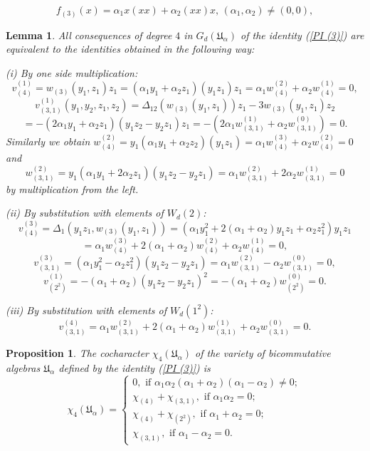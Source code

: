 \documentclass[10pt,a4paper]{amsart}
\newtheorem{lemma}{Lemma}
\newtheorem{proposition}{Proposition}
\begin{document}
\begin{equation}\label{PI (3)}
f_{(3)}(x)=\alpha_1 x(xx)+\alpha_2 (xx)x,\,(\alpha_1,\alpha_2)\not=(0,0),
\end{equation}

\begin{lemma}\label{consequences of M(3) in G}
All consequences of degree $4$ in $G_d({\mathfrak U}_{\alpha})$ of the identity {\rm (\ref{PI (3)})} are equivalent to the identities obtained in the following way:

{\rm (i)} By one side multiplication:
\[
v^{(1)}_{(4)}=w_{(3)}(y_1,z_1)z_1=(\alpha_1y_1+\alpha_2z_1)(y_1z_1)z_1=\alpha_1w_{(4)}^{(2)}+\alpha_2w_{(4)}^{(1)}=0,
\]
\[
v^{(1)}_{(3,1)}(y_1,y_2,z_1,z_2)=\Delta_{12}(w_{(3)}(y_1,z_1))z_1-3w_{(3)}(y_1,z_1)z_2
\]
\[
=-(2\alpha_1y_1+\alpha_2z_1)(y_1z_2-y_2z_1)z_1=-(2\alpha_1w_{(3,1)}^{(1)}+\alpha_2w_{(3,1)}^{(0)})=0.
\]
Similarly we obtain $w^{(2)}_{(4)}=y_1(\alpha_1y_1+\alpha_2z_2)(y_1z_1)=\alpha_1w_{(4)}^{(3)}+\alpha_2w_{(4)}^{(2)}=0$ and
\[
w^{(2)}_{(3,1)}=y_1(\alpha_1y_1+2\alpha_2z_1)(y_1z_2-y_2z_1)=\alpha_1w_{(3,1)}^{(2)}+2\alpha_2w_{(3,1)}^{(1)}=0
\]
by multiplication from the left.

{\rm (ii)} By substitution with elements of $W_d(2)$:
\[
v^{(3)}_{(4)}=\Delta_1(y_1z_1,w_{(3)}(y_1,z_1))=(\alpha_1y_1^2+2(\alpha_1+\alpha_2)y_1z_1+\alpha_2z_1^2)y_1z_1
\]
\[
=\alpha_1w_{(4)}^{(3)}+2(\alpha_1+\alpha_2)w_{(4)}^{(2)}+\alpha_2w_{(4)}^{(1)}=0,
\]
\[
v^{(3)}_{(3,1)}=(\alpha_1y_1^2-\alpha_2z_1^2)(y_1z_2-y_2z_1)=\alpha_1w_{(3,1)}^{(2)}-\alpha_2w_{(3,1)}^{(0)}=0,
\]
\[
v^{(1)}_{(2^2)}=-(\alpha_1+\alpha_2)(y_1z_2-y_2z_1)^2=-(\alpha_1+\alpha_2)w_{(2^2)}^{(0)}=0.
\]

{\rm (iii)} By substitution with elements of $W_d(1^2)$:
\[
v^{(4)}_{(3,1)}=\alpha_1w_{(3,1)}^{(2)}+2(\alpha_1+\alpha_2)w_{(3,1)}^{(1)}+\alpha_2w_{(3,1)}^{(0)}=0.
\]
\end{lemma}

\begin{proposition}\label{chi4 for (3)}
The cocharacter $\chi_4({\mathfrak U}_{\alpha})$ of the variety of bicommutative algebras ${\mathfrak U}_{\alpha}$ defined by the identity {\rm (\ref{PI (3)})} is
\[
\chi_4({\mathfrak U}_{\alpha})=\begin{cases}
0,\text{ if }\alpha_1\alpha_2(\alpha_1+\alpha_2)(\alpha_1-\alpha_2)\not=0;\\
\chi_{(4)}+\chi_{(3,1)},\text{ if }\alpha_1\alpha_2=0;\\
\chi_{(4)}+\chi_{(2^2)},\text{ if }\alpha_1+\alpha_2=0;\\
\chi_{(3,1)}, \text{ if }\alpha_1-\alpha_2=0.
\end{cases}
\]
\end{proposition}
\end{document}
